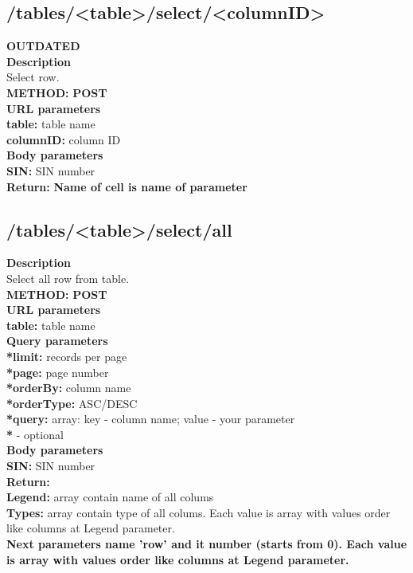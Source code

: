 \documentclass[a4paper, 12pt]{report}
\begin{document}
\subsection{/tables/<table>/select/<columnID>}
\textbf{\color{red} OUTDATED}\\
\textbf{\color{redText} Description} \\
Select row. \\
\textbf{\color{redText} METHOD: } \textbf{POST} \\
\textbf{\color{redText} URL parameters} \\
\textbf{table: } table name\\
\textbf{columnID: } column ID\\
\textbf{\color{redText} Body parameters} \\
\textbf{SIN: } SIN number\\
\textbf{\color{redText} Return: } 
\textbf{Name of cell is name of parameter}\\

\subsection{/tables/<table>/select/all}
\textbf{\color{redText} Description} \\
Select all row from table. \\
\textbf{\color{redText} METHOD: } \textbf{POST} \\
\textbf{\color{redText} URL parameters} \\
\textbf{table: } table name\\
\textbf{\color{redText} Query parameters} \\
\textbf{*limit: } records per page \\
\textbf{*page: } page number \\
\textbf{*orderBy: } column name \\
\textbf{*orderType: } ASC/DESC \\
\textbf{*query: } array: key - column name; value - your parameter \\
\textbf{*} - optional \\
\textbf{\color{redText} Body parameters} \\
\textbf{SIN: } SIN number\\
\textbf{\color{redText} Return: } \\
\textbf{Legend: } array contain name of all colums \\
\textbf{Types: } array contain type of all colums. Each value is array with values order like columns at Legend parameter. \\
\textbf{Next parameters name 'row' and it number (starts from 0). Each value is array with values order like columns at Legend parameter.}\\
\end{document}
